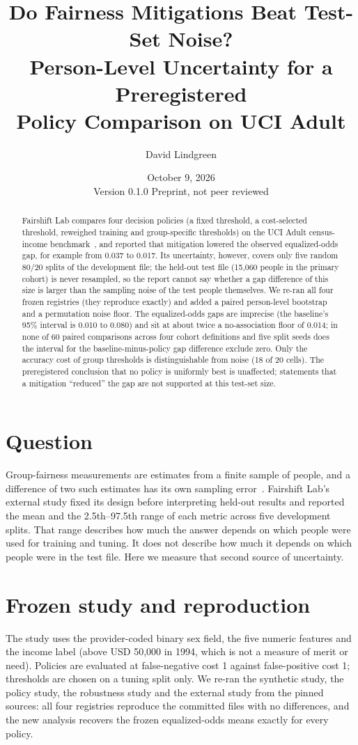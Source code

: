 \documentclass[11pt]{article}
\title{Do Fairness Mitigations Beat Test-Set Noise?\\
Person-Level Uncertainty for a Preregistered\\
Policy Comparison on UCI Adult}
\author{David Lindgreen}
\date{October 9, 2026 \\[2pt] \small Version 0.1.0 \quad Preprint, not peer reviewed}
\begin{document}
\maketitle

\begin{abstract}
Fairshift Lab compares four decision policies (a fixed threshold, a cost-selected threshold, reweighed training and group-specific
thresholds) on the UCI Adult census-income benchmark~\cite{becker1996}, and reported that mitigation lowered the observed
equalized-odds gap, for example from 0.037 to 0.017. Its uncertainty, however, covers only five random 80/20 splits of the
development file; the held-out test file (15{,}060 people in the primary cohort) is never resampled, so the report cannot say
whether a gap difference of this size is larger than the sampling noise of the test people themselves. We re-ran all four frozen
registries (they reproduce exactly) and added a paired person-level bootstrap and a permutation noise floor. The equalized-odds
gaps are imprecise (the baseline's 95\% interval is 0.010 to 0.080) and sit at about twice a no-association floor of 0.014; in none of
60 paired comparisons across four cohort definitions and five split seeds does the interval for the baseline-minus-policy gap
difference exclude zero. Only the accuracy cost of group thresholds is distinguishable from noise (18 of 20 cells). The preregistered
conclusion that no policy is uniformly best is unaffected; statements that a mitigation ``reduced'' the gap are not supported at this
test-set size.
\end{abstract}

\section{Question}
Group-fairness measurements are estimates from a finite sample of people, and a difference of two such estimates has its own
sampling error~\cite{besse2022}. Fairshift Lab's external study fixed its design before interpreting held-out results and reported the
mean and the 2.5th--97.5th range of each metric across five development splits. That range describes how much the answer depends on
which people were used for training and tuning. It does not describe how much it depends on which people were in the test file. Here
we measure that second source of uncertainty.

\section{Frozen study and reproduction}
The study uses the provider-coded binary sex field, the five numeric features and the income label (above USD 50{,}000 in 1994, which is
not a measure of merit or need). Policies are evaluated at false-negative cost 1 against false-positive cost 1; thresholds are chosen on a
tuning split only. We re-ran the synthetic study, the policy study, the robustness study and the external study from the pinned
sources: all four registries reproduce the committed files with no differences, and the new analysis recovers the frozen
equalized-odds means exactly for every policy.
\end{document}
